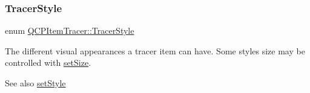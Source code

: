 \subsubsection{\texorpdfstring{Tracer\+Style}{TracerStyle}\hspace{0.1cm}{\footnotesize\ttfamily [2/2]}}
{\footnotesize\ttfamily enum \hyperlink{class_q_c_p_item_tracer_a2f05ddb13978036f902ca3ab47076500}{Q\+C\+P\+Item\+Tracer\+::\+Tracer\+Style}}

The different visual appearances a tracer item can have. Some styles size may be controlled with \hyperlink{class_q_c_p_item_tracer_ae47fe0617f5fef5fdb766999569be10a}{set\+Size}.

\begin{DoxySeeAlso}{See also}
\hyperlink{class_q_c_p_item_tracer_a41a2ac4f1acd7897b4e2a2579c03204e}{set\+Style} 
\end{DoxySeeAlso}
